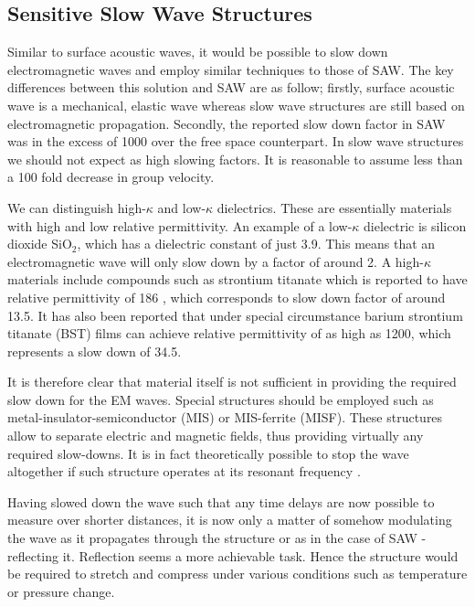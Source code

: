 \documentclass[11pt,a4paper]{article}
\begin{document}
\subsection{Sensitive Slow Wave Structures}

Similar to surface acoustic waves, it would be possible to slow down electromagnetic waves and employ similar techniques to those of SAW. The key differences between this solution and SAW are as follow; firstly, surface acoustic wave is a mechanical, elastic wave whereas slow wave structures are still based on electromagnetic propagation. Secondly, the reported slow down factor in SAW was in the excess of 1000 over the free space counterpart. In slow wave structures we should not expect as high slowing factors. It is reasonable to assume less than a 100 fold decrease in group velocity.

We can distinguish high-$\kappa$ and low-$\kappa$ dielectrics. These are essentially materials with high and low relative permittivity. An example of a low-$\kappa$ dielectric is silicon dioxide SiO$_2$, which has a dielectric constant of just 3.9. This means that an electromagnetic wave will only slow down by a factor of around 2. A high-$\kappa$ materials include compounds such as strontium titanate which is reported to have relative permittivity of 186 \cite{strtit}, which corresponds to slow down factor of around 13.5. It has also been reported \cite{bst} that under special circumstance barium strontium titanate (BST) films can achieve relative permittivity of as high as 1200, which represents a slow down of 34.5.

It is therefore clear that material itself is not sufficient in providing the required slow down for the EM waves. Special structures should be employed such as metal-insulator-semiconductor (MIS) \cite{phd} or MIS-ferrite (MISF). These structures allow to separate electric and magnetic fields, thus providing virtually any required slow-downs. It is in fact theoretically possible to stop the wave altogether if such structure operates at its resonant frequency \cite{misf}.

Having slowed down the wave such that any time delays are now possible to measure over shorter distances, it is now only a matter of somehow modulating the wave as it propagates through the structure or as in the case of SAW - reflecting it. Reflection seems a more achievable task. Hence the structure would be required to stretch and compress under various conditions such as temperature or pressure change.
\end{document}
